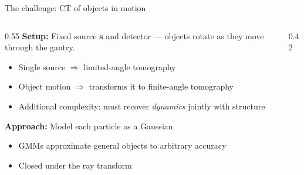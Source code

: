 \documentclass{beamer}
\begin{document}
    \begin{frame}{The challenge: CT of objects in motion}
        \begin{columns}[T]
            \begin{column}{0.55\textwidth}
                \textbf{Setup:} Fixed source $\mathbf{s}$ and detector --- objects rotate as they move through the gantry.

                \vspace{0.5em}
                \begin{itemize}
                    \item Single source $\Rightarrow$ limited-angle tomography
                    \item Object motion $\Rightarrow$ transforms it to finite-angle tomography
                    \item Additional complexity: must recover \emph{dynamics} jointly with structure
                \end{itemize}

                \vspace{0.5em}
                \textbf{Approach:} Model each particle as a Gaussian.
                \begin{itemize}
                    \item GMMs approximate general objects to arbitrary accuracy
                    \item Closed under the ray transform
                \end{itemize}
            \end{column}
            \begin{column}{0.42\textwidth}
\end{column}
\end{columns}
\end{frame}
\end{document}
